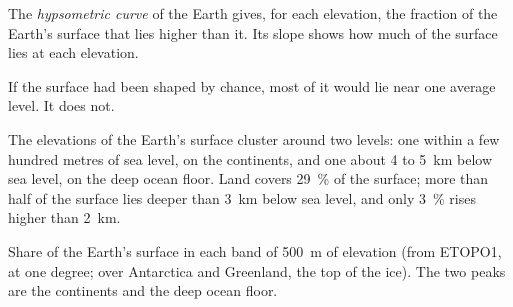 \begin{definition}\label{def:g11:lithosphere-asthenosphere:hypsometry}
The \emph{hypsometric curve} of the Earth gives, for
each elevation, the fraction of the Earth's surface that lies higher than it.
Its slope shows how much of the surface lies at each elevation.
\end{definition}

If the surface had been shaped by chance, most of it would lie near one
average level. It does not.

\begin{proposition}\label{prop:g11:lithosphere-asthenosphere:two-levels}
The elevations of the Earth's surface cluster around two levels: one within
a few hundred metres of sea level, on the continents, and one about 4 to
\qty{5}{km} below sea level, on the deep ocean floor. Land covers \qty{29}{\percent}
of the surface; more than half of the surface lies deeper than \qty{3}{km}
below sea level, and only \qty{3}{\percent} rises higher than \qty{2}{km}.
\end{proposition}

\begin{omfigure}

{\small Share of the Earth's surface in each band of \qty{500}{m} of
elevation (from ETOPO1, at one degree; over Antarctica and Greenland, the
top of the ice). The two peaks are the continents and the deep ocean floor.}
\end{omfigure}

